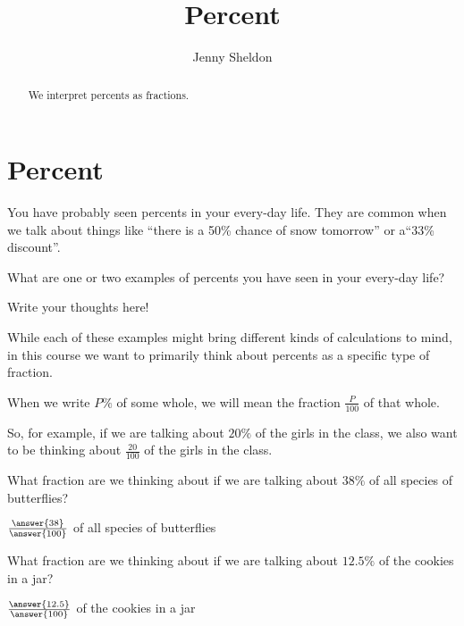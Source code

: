 \documentclass{ximera}
\title{Percent}
\author{Jenny Sheldon}
\begin{document}
\begin{abstract}
We interpret percents as fractions.
\end{abstract}
\maketitle


\section{Percent}

You have probably seen percents in your every-day life. They are common when we talk about things like ``there is a 50\% chance of snow tomorrow'' or  a``33\% discount''.
\begin{question}
What are one or two examples of percents you have seen in your every-day life?
\begin{freeResponse}
Write your thoughts here!
\end{freeResponse}
\end{question}

While each of these examples might bring different kinds of calculations to mind, in this course we want to primarily think about percents as a specific type of fraction.

\begin{definition}
When we write $P\%$ of some whole, we will mean the fraction $\frac{P}{100}$ of that whole. 
\end{definition}

So, for example, if we are talking about $20\%$ of the girls in the class, we also want to be thinking about $\frac{20}{100}$ of the girls in the class.

\begin{question}
What fraction are we thinking about if we are talking about $38\%$ of all species of butterflies?

\begin{prompt}
$\frac{\answer{38}}{\answer{100}}$ of all species of butterflies
\end{prompt}
\end{question}

\begin{question}
What fraction are we thinking about if we are talking about $12.5\%$ of the cookies in a jar?

\begin{prompt}
$\frac{\answer{12.5}}{\answer{100}}$ of the cookies in a jar
\end{prompt}
\end{question}
\end{document}
